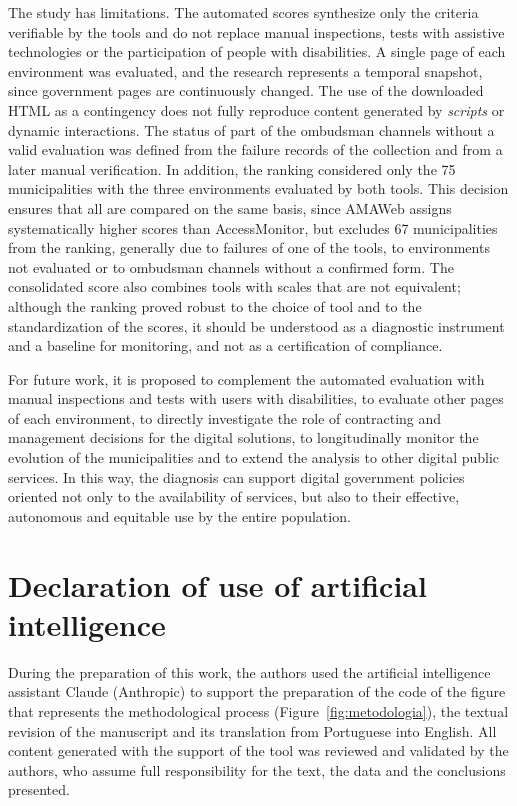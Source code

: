 \documentclass[12pt]{article}
\begin{document}
The study has limitations. The automated scores synthesize only the criteria verifiable by the tools and do not replace manual inspections, tests with assistive technologies or the participation of people with disabilities. A single page of each environment was evaluated, and the research represents a temporal snapshot, since government pages are continuously changed. The use of the downloaded HTML as a contingency does not fully reproduce content generated by \textit{scripts} or dynamic interactions. The status of part of the ombudsman channels without a valid evaluation was defined from the failure records of the collection and from a later manual verification. In addition, the ranking considered only the 75 municipalities with the three environments evaluated by both tools. This decision ensures that all are compared on the same basis, since AMAWeb assigns systematically higher scores than AccessMonitor, but excludes 67 municipalities from the ranking, generally due to failures of one of the tools, to environments not evaluated or to ombudsman channels without a confirmed form. The consolidated score also combines tools with scales that are not equivalent; although the ranking proved robust to the choice of tool and to the standardization of the scores, it should be understood as a diagnostic instrument and a baseline for monitoring, and not as a certification of compliance.

For future work, it is proposed to complement the automated evaluation with manual inspections and tests with users with disabilities, to evaluate other pages of each environment, to directly investigate the role of contracting and management decisions for the digital solutions, to longitudinally monitor the evolution of the municipalities and to extend the analysis to other digital public services. In this way, the diagnosis can support digital government policies oriented not only to the availability of services, but also to their effective, autonomous and equitable use by the entire population.


\section*{Declaration of use of artificial intelligence}

During the preparation of this work, the authors used the artificial intelligence assistant Claude (Anthropic) to support the preparation of the code of the figure that represents the methodological process (Figure~\ref{fig:metodologia}), the textual revision of the manuscript and its translation from Portuguese into English. All content generated with the support of the tool was reviewed and validated by the authors, who assume full responsibility for the text, the data and the conclusions presented.




\end{document}
